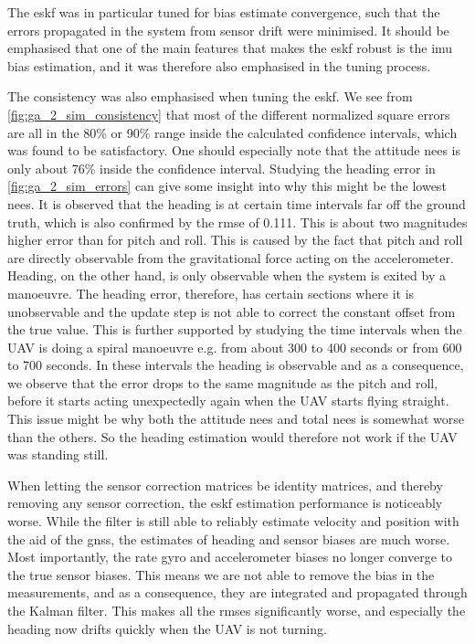 The \acrshort{eskf} was in particular tuned for bias estimate convergence, such that the errors propagated in the system from sensor drift were minimised. It should be emphasised that one of the main features that makes the \acrshort{eskf} robust is the \acrshort{imu} bias estimation, and it was therefore also emphasised in the tuning process.

The consistency was also emphasised when tuning the \acrshort{eskf}. We see from \cref{fig:ga_2_sim_consistency} that most of the different normalized square errors are all in the 80\% or 90\% range inside the calculated confidence intervals, which was found to be satisfactory. One should especially note that the attitude \acrshort{nees} is only about 76\% inside the confidence interval. Studying the heading error in \cref{fig:ga_2_sim_errors} can give some insight into why this might be the lowest \acrshort{nees}. It is observed that the heading is at certain time intervals far off the ground truth, which is also confirmed by the \acrshort{rmse} of 0.111. This is about two magnitudes higher error than for pitch and roll. This is caused by the fact that pitch and roll are directly observable from the gravitational force acting on the accelerometer. Heading, on the other hand, is only observable when the system is exited by a manoeuvre. The heading error, therefore, has certain sections where it is unobservable and the update step is not able to correct the constant offset from the true value. This is further supported by studying the time intervals when the UAV is doing a spiral manoeuvre e.g. from about 300 to 400 seconds or from 600 to 700 seconds. In these intervals the heading is observable and as a consequence, we observe that the error drops to the same magnitude as the pitch and roll, before it starts acting unexpectedly again when the UAV starts flying straight. This issue might be why both the attitude \acrshort{nees} and total \acrshort{nees} is somewhat worse than the others. So the heading estimation would therefore not work if the UAV was standing still. 

When letting the sensor correction matrices be identity matrices, and thereby removing any sensor correction, the \acrshort{eskf} estimation performance is noticeably worse. While the filter is still able to reliably estimate velocity and position with the aid of the \acrshort{gnss}, the estimates of heading and sensor biases are much worse. Most importantly, the rate gyro and accelerometer biases no longer converge to the true sensor biases. This means we are not able to remove the bias in the measurements, and as a consequence, they are integrated and propagated through the Kalman filter. This makes all the \acrshort{rmse}s significantly worse, and especially the heading now drifts quickly when the UAV is not turning.

